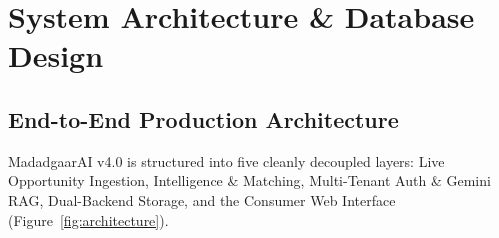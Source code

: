 \documentclass[12pt,a4paper,oneside]{report}
\begin{document}
\chapter[System Architecture]{System Architecture \& Database Design}

\section{End-to-End Production Architecture}
MadadgaarAI v4.0 is structured into five cleanly decoupled layers: Live Opportunity Ingestion, Intelligence \& Matching, Multi-Tenant Auth \& Gemini RAG, Dual-Backend Storage, and the Consumer Web Interface (Figure~\ref{fig:architecture}).
\end{document}

